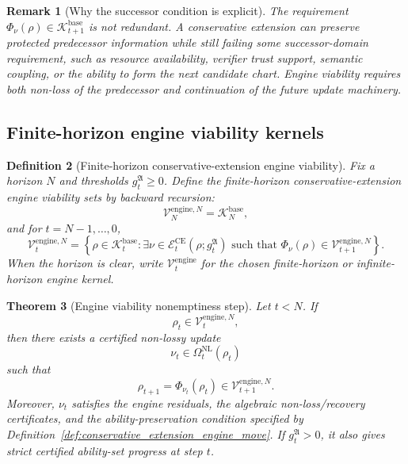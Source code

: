 \documentclass[11pt]{article}
\newtheorem{theorem}{Theorem}[section]
\newtheorem{definition}[theorem]{Definition}
\newtheorem{remark}[theorem]{Remark}
\newcommand{\Ecal}{\mathcal{E}}
\newcommand{\1}{\mathbf{1}}
\providecommand{\Kcal}{\mathcal{K}}
\providecommand{\Vcal}{\mathcal{V}}
\begin{document}
\begin{remark}[Why the successor condition is explicit]
The requirement \(\Phi_\nu(\rho)\in\Kcal_{t+1}^{\mathrm{base}}\) is not redundant.  A conservative extension can preserve protected predecessor information while still failing some successor-domain requirement, such as resource availability, verifier trust support, semantic coupling, or the ability to form the next candidate chart.  Engine viability requires both non-loss of the predecessor and continuation of the future update machinery.
\end{remark}

\subsection{Finite-horizon engine viability kernels}

\begin{definition}[Finite-horizon conservative-extension engine viability]
\label{def:finite_horizon_engine_viability}
Fix a horizon \(N\) and thresholds \(g_t^{\mathfrak A}\ge0\).  Define the finite-horizon conservative-extension engine viability sets by backward recursion:
\[
\Vcal_N^{\mathrm{engine},N}
=
\Kcal_N^{\mathrm{base}},
\]
and for \(t=N-1,\ldots,0\),
\[
\boxed{
\Vcal_t^{\mathrm{engine},N}
=
\left\{
\rho\in\Kcal_t^{\mathrm{base}}:
\exists\nu\in\Ecal_t^{\mathrm{CE}}(\rho;g_t^{\mathfrak A})
\text{ such that }
\Phi_\nu(\rho)
\in
\Vcal_{t+1}^{\mathrm{engine},N}
\right\}.
}
\]
When the horizon is clear, write \(\Vcal_t^{\mathrm{engine}}\) for the chosen finite-horizon or infinite-horizon engine kernel.
\end{definition}

\begin{theorem}[Engine viability nonemptiness step]
\label{thm:engine_viability_nonemptiness_step}
Let \(t<N\).  If
\[
\rho_t\in\Vcal_t^{\mathrm{engine},N},
\]
then there exists a certified non-lossy update
\[
\nu_t\in\Omega_t^{\mathrm{NL}}(\rho_t)
\]
such that
\[
\rho_{t+1}=\Phi_{\nu_t}(\rho_t)
\in
\Vcal_{t+1}^{\mathrm{engine},N}.
\]
Moreover, \(\nu_t\) satisfies the engine residuals, the algebraic non-loss/recovery certificates, and the ability-preservation condition specified by Definition~\ref{def:conservative_extension_engine_move}.  If \(g_t^{\mathfrak A}>0\), it also gives strict certified ability-set progress at step \(t\).
\end{theorem}
\end{document}
